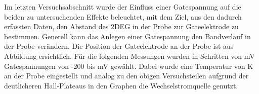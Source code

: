 
Im letzten Versuchsabschnitt wurde der Einfluss einer Gatespannung auf die beiden zu untersuchenden Effekte beleuchtet, mit dem Ziel, aus den dadurch erfassten Daten, den Abstand des 2DEG in der Probe zur Gateelektrode zu bestimmen. Generell kann das Anlegen einer Gatespannung den Bandverlauf in der Probe verändern. %
Die Position der Gateelektrode an der Probe ist aus Abbildung %
ersichtlich. 
Für die folgenden Messungen wurden in Schritten von \unit[50]{mV} Gatespannungen von -200 bis \unit[200]{mV} gewählt.
Dabei wurde eine Temperatur von \unit[2]{K} an der Probe eingestellt und analog zu den obigen Versuchsteilen aufgrund der deutlicheren Hall-Plateaus in den Graphen die Wechselstromquelle genutzt. 






